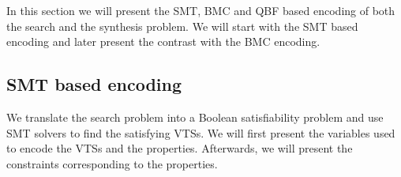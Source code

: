 %
%
%

In this section we will present the SMT, BMC and QBF based encoding of both the search and the synthesis problem. We will start with the SMT based encoding and later present the contrast with the BMC encoding.

\subsection{SMT based encoding}
\label{enc:smt}


We translate the search problem into a Boolean satisfiability
problem and use SMT solvers to find the satisfying VTSs.
%
We will first present the variables used to encode the
VTSs and the properties.
%
Afterwards, we will present the constraints corresponding to the
properties.

